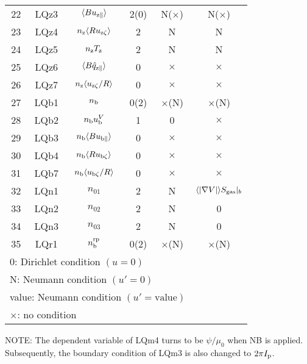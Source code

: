 \documentclass[11pt]{article}
\def\r#1{{\rm#1}}
\def\aves#1{\langle#1\rangle}
\def\para{\parallel}
\def\nz{n_\r{z}}
\def\nb{n_\r{b}}
\def\Tz{T_\r{z}}
\def\uzt#1{u_{\r{#1}\zeta}}
\def\upara#1{u_{\r{#1}\para}}
\def\qhatpara#1{\hat{q}_{\r{#1}\para}}
\def\uV#1{u_\r{#1}^V}
\def\nbrp{n_\r{b}^\r{rp}}
\def\nna{n_{01}}
\def\nnb{n_{02}}
\def\nnc{n_{03}}
\begin{document}
\begin{tabular}{|c|c|c|c|c|c|}
 22   & LQz3 & $\aves{B\upara{z}}$    & 2(0) &  N($\times$) & N($\times$)\\
 23   & LQz4 & $\nz\aves{R\uzt{z}}$   & 2    &  N           & N\\
 24   & LQz5 & $\nz \Tz$            & 2    &  N           & N\\
 25   & LQz6 & $\aves{B\qhatpara{z}}$ & 0    &  $\times$    & $\times$\\
 26   & LQz7 & $\nz\aves{\uzt{z}/R}$  & 0    &  $\times$    & $\times$\\
 27   & LQb1 & $\nb$                & 0(2) &  $\times$(N) & $\times$(N)\\
 28   & LQb2 & $\nb\uV{b}$            & 1    &  0           & $\times$\\
 29   & LQb3 & $\nb\aves{B\upara{b}}$ & 0    &  $\times$    & $\times$\\
 30   & LQb4 & $\nb\aves{R\uzt{b}}$   & 0    &  $\times$    & $\times$\\
 31   & LQb7 & $\nb\aves{\uzt{b}/R}$  & 0    &  $\times$    & $\times$\\
 32   & LQn1 & $\nna$               & 2    &  N           & $\aves{|\nabla V|}S_\r{gas}|_b$\\
 33   & LQn2 & $\nnb$               & 2    &  N           & 0\\
 34   & LQn3 & $\nnc$               & 2    &  N           & 0\\
 35   & LQr1 & $\nbrp$              & 0(2) &  $\times$(N) & $\times$(N)\\\hline
 \multicolumn{5}{l}{0: Dirichlet condition $(u=0)$}\\
 \multicolumn{5}{l}{N: Neumann condition $(u'=0)$}\\
 \multicolumn{5}{l}{value: Neumann condition $(u'=\mbox{value})$}\\
 \multicolumn{5}{l}{$\times$: no condition}
\end{tabular}
%

\medskip

NOTE: The dependent variable of LQm4 turns to be $\psi/\mu_0$ when NB is
applied. Subsequently, the boundary condition of LQm3 is also changed to
$2\pi I_\r{p}$.
\end{document}
